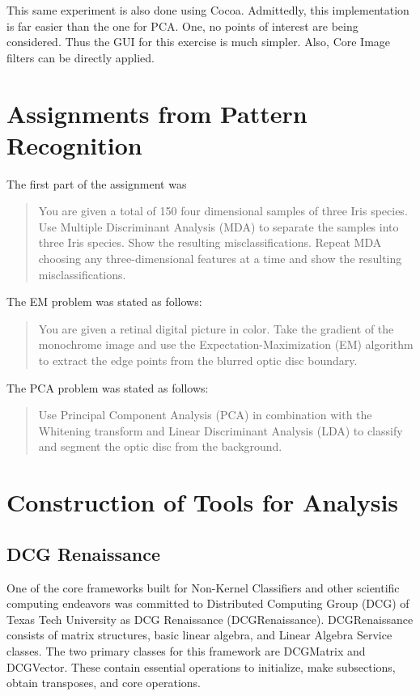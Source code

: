 \documentclass[12pt]{report}
\begin{document}
This same experiment is also done using Cocoa.  Admittedly, this implementation is far easier than the one for PCA.   One, no points of interest are being considered.  Thus the GUI for this exercise is much simpler.   Also, Core Image filters can be directly applied.   



\chapter{Assignments from Pattern Recognition}

The first part of the assignment was 
\begin{quote}
	You are given a total of 150 four dimensional samples of three Iris species.  Use Multiple Discriminant Analysis (MDA) to separate the samples into three Iris species. Show the resulting misclassifications.   Repeat MDA choosing any three-dimensional features at a time and show the resulting misclassifications.
\end{quote}

The EM problem was stated as follows:
\begin{quote}
 You are given a retinal digital picture in color.  Take the gradient of the monochrome image and use the Expectation-Maximization (EM) algorithm to extract the edge points from the blurred optic disc boundary.
\end{quote}


The PCA problem was stated as follows:
\begin{quote}
	Use Principal Component Analysis (PCA) in combination with the Whitening transform and Linear Discriminant Analysis (LDA) to classify and segment the optic disc from the background.

\end{quote}


\chapter{Construction of Tools for Analysis} 

\section{DCG Renaissance}
One of the core frameworks built for Non-Kernel Classifiers and other scientific computing endeavors was committed to Distributed Computing Group (DCG) of Texas Tech University as DCG Renaissance (DCGRenaissance).  DCGRenaissance consists of matrix structures, basic linear algebra, and Linear Algebra Service classes.  The two primary classes for this framework are DCGMatrix and DCGVector.  These contain essential operations to initialize, make subsections,  obtain transposes, and core operations.   
\end{document}
